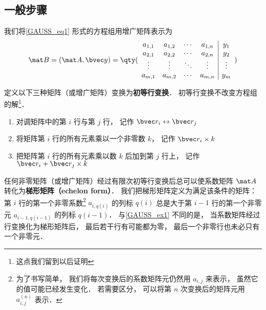 \subsection{一般步骤}

我们将\autoref{GAUSS_eq1} 形式的方程组用增广矩阵表示为
\begin{equation}
\mat B=(\mat A ,\bvec y)={
	\qty( \begin{array}{cccc|c}
	a_{1,1} &a_{1,2} &\cdots &a_{1,n} &y_1 \\
	a_{2,1} &a_{2,2} &\cdots &a_{2,n} &y_2 \\
	\vdots  &\vdots  &\ddots &\vdots  &\vdots \\
	a_{m,1} &a_{m,2} &\cdots &a_{m,n} &y_m \\
	\end{array} 
	)}
\end{equation}

定义以下三种矩阵（或增广矩阵）变换为\textbf{初等行变换}． 初等行变换不改变方程组的解\footnote{这点我们留到以后证明}．%
\begin{enumerate}
\item 对调矩阵中的第 $i$ 行与第 $j$ 行， 记作 $\bvec r_i \leftrightarrow \bvec r_j$

\item 将矩阵第 $i$ 行的所有元素乘以一个非零数 $k$， 记作 $\bvec r_i \times k$

\item 把矩阵第 $i$ 行的所有元素乘以数 $k$ 后加到第 $j$ 行上， 记作 $\bvec r_i + \bvec r_j \times k$
\end{enumerate}

任何非零矩阵（或增广矩阵）经过有限次初等行变换后总可以使系数矩阵 $\mat A$ 转化为\textbf{梯形矩阵（echelon form）}． 我们把梯形矩阵定义为满足该条件的矩阵： 第 $i$ 行的第一个非零系数\footnote{为了书写简单， 我们将每次变换后的系数矩阵元仍然用 $a_{i,j}$ 来表示， 虽然它的值可能已经发生变化． 若需要区分， 可以将第 $n$ 次变换后的矩阵元用 $a_{i,j}^{(n)}$ 表示．} $a_{i,q(i)}$ 的列标 $q(i)$ 总是大于第 $i-1$ 行的第一个非零元 $a_{i-1, q(i-1)}$ 的列标 $q(i-1)$． 与\autoref{GAUSS_ex1} 不同的是， 当系数矩阵经过行变换化为梯形矩阵后， 最后若干行有可能都为零， 最后一个非零行也未必只有一个非零元．

